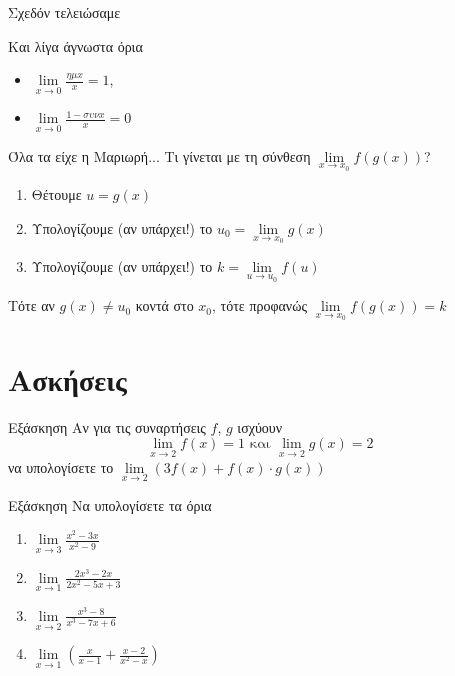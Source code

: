 \documentclass[greek]{beamer}
\begin{document}
\begin{frame}{Σχεδόν τελειώσαμε}
  \begin{block}{Και λίγα άγνωστα όρια}
    \begin{itemize}
      \item $\lim\limits_{x \to 0}{ \frac{ημx}{x} }=1$, \pause
      \item $\lim\limits_{x \to 0}{ \frac{1-συνx}{x} }=0$
    \end{itemize}
  \end{block}
\end{frame}

\begin{frame}{Όλα τα είχε η Μαριωρή...}
  Τι γίνεται με τη σύνθεση  $\lim\limits_{x \to x_0}{ f(g(x))}$? \pause
  \begin{enumerate}
    \item Θέτουμε $u=g(x)$ \pause
    \item Υπολογίζουμε (αν υπάρχει!) το $u_0=\lim\limits_{x \to x_0}{ g(x)}$ \pause
    \item Υπολογίζουμε (αν υπάρχει!) το $k=\lim\limits_{u \to u_0}{ f(u)}$ \pause
  \end{enumerate}
  Τότε αν $g(x)\ne u_0$ κοντά στο $x_0$, τότε προφανώς $\lim\limits_{x \to x_0}{ f(g(x))}=k$
\end{frame}

\section{Ασκήσεις}
\begin{frame}{Εξάσκηση}
  Αν για τις συναρτήσεις $f$, $g$ ισχύουν
  $$\lim\limits_{x \to 2}{ f(x) }=1 \text{ και } \lim\limits_{ x \to 2}{ g(x) }=2$$
  να υπολογίσετε το $\lim\limits_{x \to 2}{ (3f(x)+f(x)\cdot g(x)) }$
\end{frame}

\begin{frame}{Εξάσκηση}
  Να υπολογίσετε τα όρια
  \begin{enumerate}
    \item $\lim\limits_{x \to 3}{ \frac{x^2-3x}{x^2-9} }$ \pause
    \item $\lim\limits_{x \to 1}{ \frac{2x^3-2x}{2x^2-5x+3} }$ \pause
    \item $\lim\limits_{x \to 2}{ \frac{x^3-8}{x^3-7x+6} }$ \pause
    \item $\lim\limits_{x \to 1}{ \left( \frac{x}{x-1}+\frac{x-2}{x^2-x}  \right)  }$
  \end{enumerate}
\end{frame}
\end{document}
